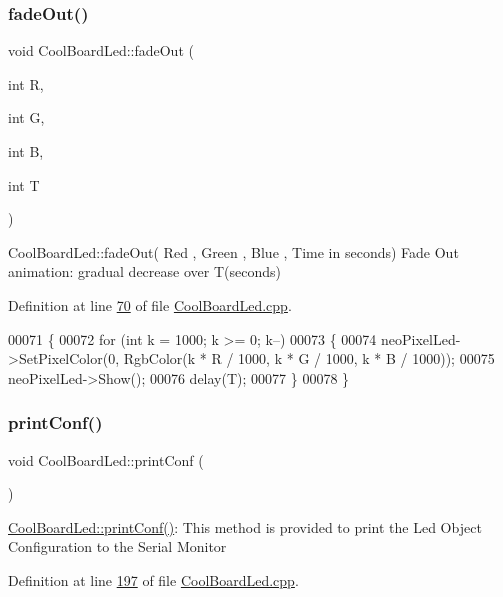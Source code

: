 \subsubsection{\texorpdfstring{fade\+Out()}{fadeOut()}}
{\footnotesize\ttfamily void Cool\+Board\+Led\+::fade\+Out (\begin{DoxyParamCaption}\item[{int}]{R,  }\item[{int}]{G,  }\item[{int}]{B,  }\item[{int}]{T }\end{DoxyParamCaption})}

Cool\+Board\+Led\+::fade\+Out( Red , Green , Blue , Time in seconds) Fade Out animation\+: gradual decrease over T(seconds) 

Definition at line \hyperlink{_cool_board_led_8cpp_source_l00070}{70} of file \hyperlink{_cool_board_led_8cpp_source}{Cool\+Board\+Led.\+cpp}.


\begin{DoxyCode}
00071 \{
00072     \textcolor{keywordflow}{for} (\textcolor{keywordtype}{int} k = 1000; k >= 0; k--) 
00073     \{
00074         neoPixelLed->SetPixelColor(0, RgbColor(k * R / 1000, k * G / 1000, k * B / 1000));
00075         neoPixelLed->Show();
00076         delay(T);
00077     \}
00078 \}
\end{DoxyCode}
\mbox{\label{class_cool_board_led_a8ed3053a36f0ed4a131f43b5b17efb61}} 
\subsubsection{\texorpdfstring{print\+Conf()}{printConf()}}
{\footnotesize\ttfamily void Cool\+Board\+Led\+::print\+Conf (\begin{DoxyParamCaption}{ }\end{DoxyParamCaption})}

\hyperlink{class_cool_board_led_a8ed3053a36f0ed4a131f43b5b17efb61}{Cool\+Board\+Led\+::print\+Conf()}\+: This method is provided to print the Led Object Configuration to the Serial Monitor 

Definition at line \hyperlink{_cool_board_led_8cpp_source_l00197}{197} of file \hyperlink{_cool_board_led_8cpp_source}{Cool\+Board\+Led.\+cpp}.



